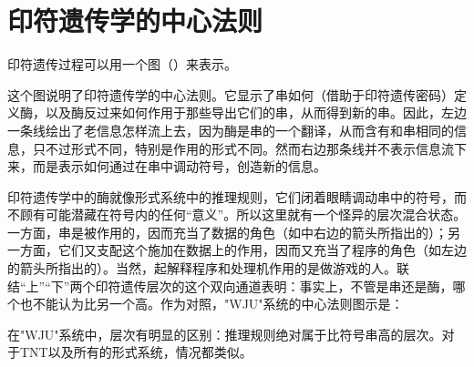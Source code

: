 \section{印符遗传学的中心法则}

印符遗传过程可以用一个图（）来表示。

\begin{figure}
\begin{lrbox}{\TEMPBOX}
\end{lrbox}
\end{figure}

这个图说明了印符遗传学的中心法则。它显示了串如何（借助于印符遗传密码）定义酶，以及酶反过来如何作用于那些导出它们的串，从而得到新的串。因此，左边一条线绘出了老信息怎样流上去，因为酶是串的一个翻译，从而含有和串相同的信息，只不过形式不同，特别是作用的形式不同。然而右边那条线并不表示信息流下来，而是表示如何通过在串中调动符号，创造新的信息。

印符遗传学中的酶就像形式系统中的推理规则，它们闭着眼睛调动串中的符号，而不顾有可能潜藏在符号内的任何“意义”。所以这里就有一个怪异的层次混合状态。一方面，串是被作用的，因而充当了数据的角色（如中右边的箭头所指出的）；另一方面，它们又支配这个施加在数据上的作用，因而又充当了程序的角色（如左边的箭头所指出的）。当然，起解释程序和处理机作用的是做游戏的人。联结“上”“下”两个印符遗传层次的这个双向通道表明：事实上，不管是串还是酶，哪个也不能认为比另一个高。作为对照，"WJU"系统的中心法则图示是：
\begin{figure}[H]
\end{figure}
在"WJU"系统中，层次有明显的区别：推理规则绝对属于比符号串高的层次。对于TNT以及所有的形式系统，情况都类似。

